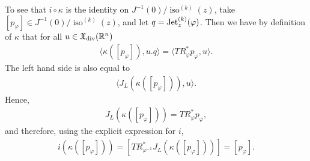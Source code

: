 \documentclass[12pt]{amsart}
\DeclareMathOperator{\iso}{iso}
\begin{document}
To see that $i \circ \kappa$ is the identity on $J^{-1}(0)/\iso^{(k)}(z)$, take $[p_\varphi] \in J^{-1}(0)/\iso^{(k)}(z)$, and let $q = {\rm Jet}^{(k)}_z(\varphi)$. Then we have by definition of $\kappa$ that for all $u \in \mathfrak{X}_{\rm div}(\mathbb{R}^n)$
\begin{align}
	\langle \kappa([p_\varphi]), u.q\rangle = \langle TR^*_\varphi p_\varphi, u\rangle.
\end{align}
The left hand side is also equal to
\begin{align}
	\langle J_L( \kappa([p_\varphi])), u\rangle.
\end{align}
Hence, 
\begin{align}
	J_L( \kappa([p_\varphi])) = TR^*_\varphi p_\varphi,
\end{align}
and therefore, using the explicit expression for $i$,
\begin{align}
	i(\kappa([p_\varphi])) = [ TR^*_{\varphi^{-1}} J_L( \kappa([p_\varphi])) ] = [p_\varphi].
\end{align}














\end{document}

